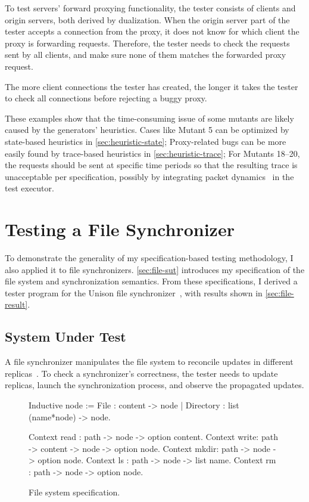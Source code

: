 \begin{itemize}
    To test servers' forward proxying functionality, the tester consists of
    clients and origin servers, both derived by dualization.  When the origin
    server part of the tester accepts a connection from the proxy, it does not
    know for which client the proxy is forwarding requests.  Therefore, the
    tester needs to check the requests sent by all clients, and make sure none
    of them matches the forwarded proxy request.

    The more client connections the tester has created, the longer it takes the
    tester to check all connections before rejecting a buggy proxy.
\end{itemize}

These examples show that the time-consuming issue of some mutants are likely
caused by the generators' heuristics.  Cases like Mutant 5 can be optimized by
state-based heuristics in \autoref{sec:heuristic-state}; Proxy-related bugs can
be more easily found by trace-based heuristics in \autoref{sec:heuristic-trace};
For Mutants 18--20, the requests should be sent at specific time periods so that
the resulting trace is unacceptable per specification, possibly by integrating
packet dynamics~\cite{pkt-dyn} in the test executor.

\section{Testing a File Synchronizer}
\label{sec:sync}

To demonstrate the generality of my specification-based testing methodology, I
also applied it to file synchronizers.  \autoref{sec:file-sut} introduces my
specification of the file system and synchronization semantics.  From these
specifications, I derived a tester program for the Unison file
synchronizer~\cite{unison}, with results shown in \autoref{sec:file-result}.

\subsection{System Under Test}
\label{sec:file-sut}
A file synchronizer manipulates the file system to reconcile updates in
different replicas~\cite{what-sync}.  To check a synchronizer's correctness, the
tester needs to update replicas, launch the synchronization process, and observe
the propagated updates.

\begin{figure}
\begin{coq}
  Inductive node :=
    File      : content          -> node
  | Directory : list (name*node) -> node.

  Context read : path -> node    -> option content.
  Context write: path -> content -> node -> option node.
  Context mkdir: path -> node    -> option node.
  Context ls   : path -> node    -> list name.
  Context rm   : path -> node    -> option node.
\end{coq}
\caption{File system specification.}
\label{fig:file-spec}
\end{figure}

